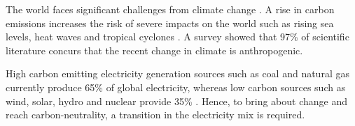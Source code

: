 
The world faces significant challenges from climate change \cite{Masson-Delmotte2018}. A rise in carbon emissions increases the risk of severe impacts on the world such as rising sea levels, heat waves and tropical cyclones \cite{Masson-Delmotte2018}. A survey \cite{Cook2013} showed that 97\% of scientific literature concurs that the recent change in climate is anthropogenic.

 High carbon emitting electricity generation sources such as coal and natural gas currently produce 65\% of global electricity, whereas low carbon sources such as wind, solar, hydro and nuclear provide 35\% \cite{BP2018}. Hence, to bring about change and reach carbon-neutrality, a transition in the electricity mix is required.











